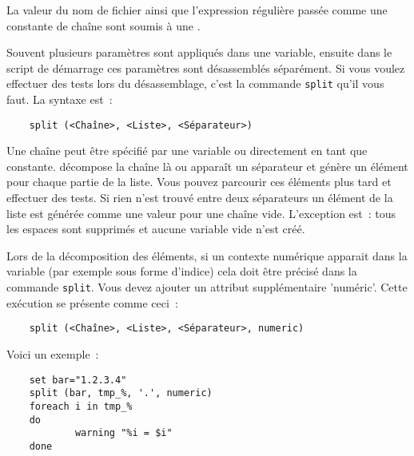     La valeur du nom de fichier ainsi que l'expression régulière passée comme une constante
	de chaîne sont soumis à une .



    Souvent plusieurs paramètres sont appliqués dans une variable, ensuite
    dans le script de démarrage ces paramètres sont désassemblés séparément.
    Si vous voulez effectuer des tests lors du désassemblage,
    c’est la commande \texttt{split} qu’il vous faut. La syntaxe est~:

\begin{example}
\begin{verbatim}
    split (<Chaîne>, <Liste>, <Séparateur>)
\end{verbatim}
\end{example}

    Une chaîne peut être spécifié par une variable ou directement en tant que constante.
	 décompose la chaîne là ou apparaît un séparateur et génère un élément
	 pour chaque partie de la liste. Vous pouvez parcourir ces éléments plus tard et
	 effectuer des tests. Si rien n'est trouvé entre deux séparateurs un élément de la
	 liste est générée comme une valeur pour une chaîne vide. L'exception \og{} \fg{} est~:
	 tous les espaces sont supprimés et aucune variable vide n'est créé.

    Lors de la décomposition des éléments, si un contexte numérique apparait
    dans la variable (par exemple sous forme d'indice) cela doit être précisé dans
	la commande \texttt{split}. Vous devez ajouter un attribut supplémentaire 'numéric'.
	Cette exécution se présente comme ceci~:

\begin{example}
\begin{verbatim}
    split (<Chaîne>, <Liste>, <Séparateur>, numeric)
\end{verbatim}
\end{example}

   Voici un exemple~:

\begin{example}
\begin{verbatim}
    set bar="1.2.3.4"
    split (bar, tmp_%, '.', numeric)
    foreach i in tmp_%
    do
            warning "%i = $i"
    done
\end{verbatim}
\end{example}

